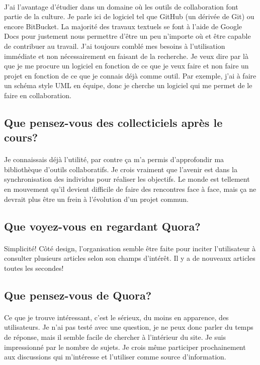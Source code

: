 \documentclass[12pt]{article}
\begin{document}
\paragraph{}
J'ai l'avantage d'étudier dans un domaine où les outils de collaboration font partie de la culture. Je parle ici de logiciel tel que GitHub (un dérivée de Git) ou encore BitBucket. La majorité des travaux textuels se font à l'aide de Google Docs pour justement nous permettre d'être un peu n'importe où et être capable de contribuer au travail. J'ai toujours comblé mes besoins à l'utilisation immédiate et non nécessairement en faisant de la recherche. Je veux dire par là que je me procure un logiciel en fonction de ce que je veux faire et non faire un projet en fonction de ce que je connais déjà comme outil. Par exemple, j'ai à faire un schéma style UML en équipe, donc je cherche un logiciel qui me permet de le faire en collaboration.

\subsection{Que pensez-vous des collecticiels après le cours?}
\paragraph{}
Je connaissais déjà l'utilité, par contre ça m'a permis d'approfondir ma bibliothèque d'outils collaboratifs. Je crois vraiment que l'avenir est dans la synchronisation des individus pour réaliser les objectifs. Le monde est tellement en mouvement qu'il devient difficile de faire des rencontres face à face, mais ça ne devrait plus être un frein à l'évolution d'un projet commun.

\subsection{Que voyez-vous en regardant Quora?}
\paragraph{}
Simplicité! Côté design, l'organisation semble être faite pour inciter l'utilisateur à consulter plusieurs articles selon son champs d'intérêt. Il y a de nouveaux articles toutes les secondes!

\subsection{Que pensez-vous de Quora?}
\paragraph{}
Ce que je trouve intéressant, c'est le sérieux, du moins en apparence, des utilisateurs. Je n'ai pas testé avec une question, je ne peux donc parler du temps de réponse, mais il semble facile de chercher à l'intérieur du site. Je suis impressionné par le nombre de sujets. Je crois même participer prochainement aux discussions qui m'intéresse et l'utiliser comme source d'information.
\end{document}
